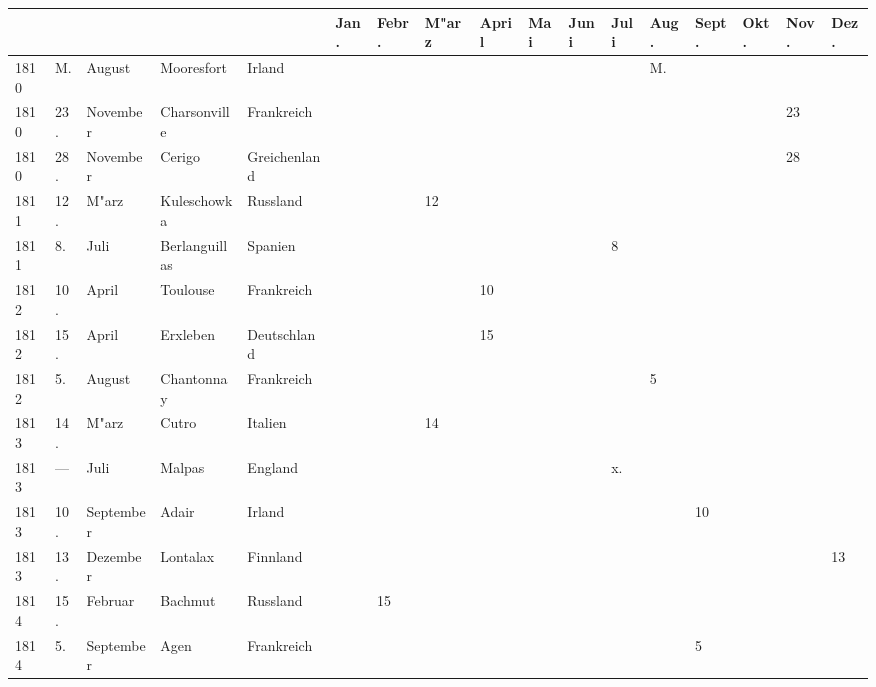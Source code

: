 \documentclass[a4paper, 8pt, oneside, polutonikogreek, german]{article}
\begin{document}
\begin{landscape}
\vspace*{\fill}
\begin{table}[H]
    \footnotesize
    \centering
    \begin{longtable}{|p{5mm}|p{4mm}|p{13mm}|p{17mm}|p{17mm}|p{4mm}|p{6mm}|p{6mm}|p{6mm}|p{4mm}|p{5mm}|p{4mm}|p{5mm}|p{6mm}|p{5mm}|p{5mm}|p{5mm}|}
    \hline
         &  &  &  &  & Jan. & Febr. & M"arz & April & Mai & Juni & Juli & Aug. & Sept. & Okt. & Nov. & Dez. \\ \hline
        1810 & M. & August & Mooresfort & Irland & ~ & ~ & ~ & ~ & ~ & ~ & ~ & M. & ~ & ~ & ~ & ~ \\ \hline
        1810 & 23. & November & Charsonville & Frankreich & ~ & ~ & ~ & ~ & ~ & ~ & ~ & ~ & ~ & ~ & 23 & ~ \\ \hline
        1810 & 28. & November & Cerigo & Greichenland & ~ & ~ & ~ & ~ & ~ & ~ & ~ & ~ & ~ & ~ & 28 & ~ \\ \hline
        1811 & 12. & M"arz & Kuleschowka & Russland & ~ & ~ & 12 & ~ & ~ & ~ & ~ & ~ & ~ & ~ & ~ & ~ \\ \hline
        1811 & 8. & Juli & Berlanguillas & Spanien & ~ & ~ & ~ & ~ & ~ & ~ & 8 & ~ & ~ & ~ & ~ & ~ \\ \hline
        1812 & 10. & April & Toulouse & Frankreich & ~ & ~ & ~ & 10 & ~ & ~ & ~ & ~ & ~ & ~ & ~ & ~ \\ \hline
        1812 & 15. & April & Erxleben & Deutschland & ~ & ~ & ~ & 15 & ~ & ~ & ~ & ~ & ~ & ~ & ~ & ~ \\ \hline
        1812 & 5. & August & Chantonnay & Frankreich & ~ & ~ & ~ & ~ & ~ & ~ & ~ & 5 & ~ & ~ & ~ & ~ \\ \hline
        1813 & 14. & M"arz & Cutro & Italien & ~ & ~ & 14 & ~ & ~ & ~ & ~ & ~ & ~ & ~ & ~ & ~ \\ \hline
        1813 & --- & Juli & Malpas & England & ~ & ~ & ~ & ~ & ~ & ~ & x. & ~ & ~ & ~ & ~ & ~ \\ \hline
        1813 & 10. & September & Adair & Irland & ~ & ~ & ~ & ~ & ~ & ~ & ~ & ~ & 10 & ~ & ~ & ~ \\ \hline
        1813 & 13. & Dezember & Lontalax & Finnland & ~ & ~ & ~ & ~ & ~ & ~ & ~ & ~ & ~ & ~ & ~ & 13 \\ \hline
        1814 & 15. & Februar & Bachmut & Russland & ~ & 15 & ~ & ~ & ~ & ~ & ~ & ~ & ~ & ~ & ~ & ~ \\ \hline
        1814 & 5. & September & Agen & Frankreich & ~ & ~ & ~ & ~ & ~ & ~ & ~ & ~ & 5 & ~ & ~ & ~ \\ \hline

\end{longtable}
\end{table}
\end{landscape}
\end{document}
